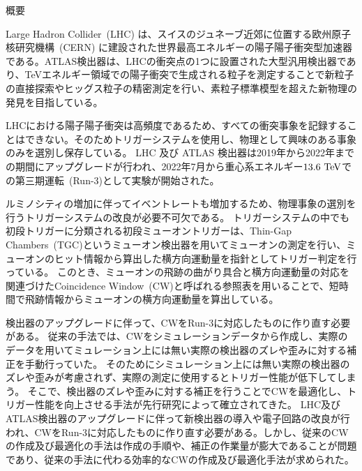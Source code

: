 \begin{center}
  \begin{huge}
    概要
  \end{huge}
\end{center}

\vspace{10pt}

Large Hadron Collider~(LHC) は、スイスのジュネーブ近郊に位置する欧州原子核研究機構~(CERN) に建設された世界最高エネルギーの陽子陽子衝突型加速器である。ATLAS検出器は、LHCの衝突点の1つに設置された大型汎用検出器であり、TeVエネルギー領域での陽子衝突で生成される粒子を測定することで新粒子の直接探索やヒッグス粒子の精密測定を行い、素粒子標準模型を超えた新物理の発見を目指している。

LHCにおける陽子陽子衝突は高頻度であるため、すべての衝突事象を記録することはできない。そのためトリガーシステムを使用し、物理として興味のある事象のみを選別し保存している。
LHC 及び ATLAS 検出器は2019年から2022年までの期間にアップグレードが行われ、2022年7月から重心系エネルギー$13.6~{\rm TeV}$での第三期運転~(Run-3)として実験が開始された。

ルミノシティの増加に伴ってイベントレートも増加するため、物理事象の選別を行うトリガーシステムの改良が必要不可欠である。
トリガーシステムの中でも初段トリガーに分類される初段ミューオントリガーは、Thin-Gap Chambers~(TGC)というミューオン検出器を用いてミューオンの測定を行い、ミューオンのヒット情報から算出した横方向運動量を指針としてトリガー判定を行っている。
このとき、ミューオンの飛跡の曲がり具合と横方向運動量の対応を関連づけたCoincidence Window~(CW)と呼ばれる参照表を用いることで、短時間で飛跡情報からミューオンの横方向運動量を算出している。

検出器のアップグレードに伴って、CWをRun-3に対応したものに作り直す必要がある。
従来の手法では、CWをシミュレーションデータから作成し、実際のデータを用いてミュレーション上には無い実際の検出器のズレや歪みに対する補正を手動行っていた。
そのためにシミュレーション上には無い実際の検出器のズレや歪みが考慮されず、実際の測定に使用するとトリガー性能が低下してしまう。
そこで、検出器のズレや歪みに対する補正を行うことでCWを最適化し、トリガー性能を向上させる手法が先行研究によって確立されてきた。
LHC及びATLAS検出器のアップグレードに伴って新検出器の導入や電子回路の改良が行われ、CWをRun-3に対応したものに作り直す必要がある。しかし、従来のCWの作成及び最適化の手法は作成の手順や、補正の作業量が膨大であることが問題であり、従来の手法に代わる効率的なCWの作成及び最適化手法が求められた。


